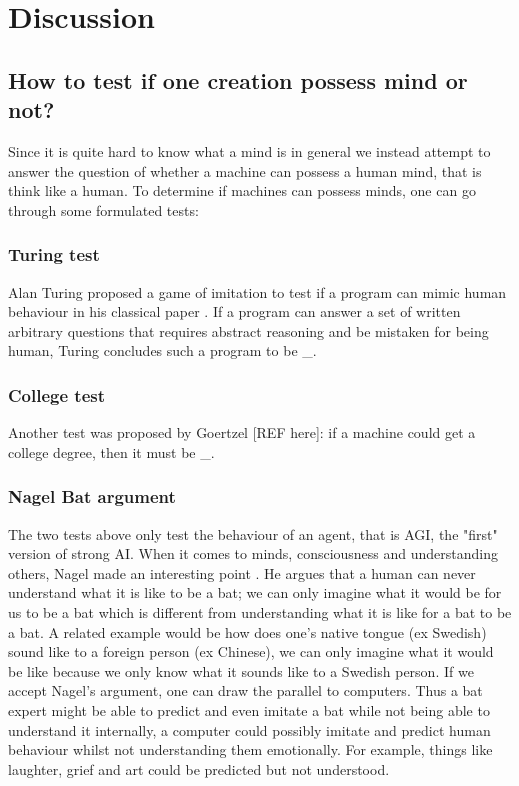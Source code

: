 \documentclass[11pt]{article}
\begin{document}
\section{Discussion}
\label{sec:discussion}

\subsection{How to test if one creation possess mind or not?}

Since it is quite hard to know what a mind is in general we instead attempt to answer the question of whether a machine can possess a human mind, that is think like a human. To determine if machines can possess minds, one can go through some formulated tests:

\subsubsection*{Turing test}

Alan Turing proposed a game of imitation to test if a program can mimic human behaviour in his classical paper \cite{turing1950computing}. If a program can answer a set of written arbitrary questions that requires abstract reasoning and be mistaken for being human, Turing concludes such a program to be \_.

\subsubsection*{College test}

Another test was proposed by Goertzel [REF here]: if a machine could get a college degree, then it must be \_. 

\subsubsection*{Nagel Bat argument}

The two tests above only test the behaviour of an agent, that is AGI, the "first" version of strong AI. When it comes to minds, consciousness and understanding others, Nagel made an interesting point \cite{nagel1974like}. He argues that a human can never understand what it is like to be a bat; we can only imagine what it would be for us to be a bat which is different from understanding what it is like for a bat to be a bat. A related example would be how does one’s native tongue (ex Swedish) sound like to a foreign person (ex Chinese), we can only imagine what it would be like because we only know what it sounds like to a Swedish person. If we accept Nagel's argument, one can draw the parallel to computers. Thus a bat expert might be able to predict and even imitate a bat while not being able to understand it internally, a computer could possibly imitate and predict human behaviour whilst not understanding them emotionally. For example, things like laughter, grief and art could be predicted but not understood.
\end{document}
